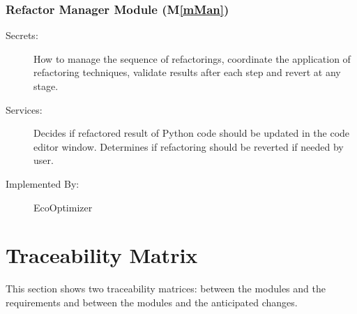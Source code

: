 \documentclass[12pt, titlepage]{article}
\newcommand{\mref}[1]{M\ref{#1}}
\begin{document}
\subsubsection{Refactor Manager Module (\mref{mMan})}


\begin{description}
    \item[Secrets:] How to manage the sequence of refactorings, coordinate the application of refactoring techniques, validate results after each step and revert at any stage.
    \item[Services:] Decides if refactored result of Python code should be updated in the code editor window. Determines if refactoring should be reverted if needed by user.
    \item[Implemented By:] EcoOptimizer
\end{description}

\section{Traceability Matrix} \label{SecTM}

This section shows two traceability matrices: between the modules and the
requirements and between the modules and the anticipated changes.
\end{document}
